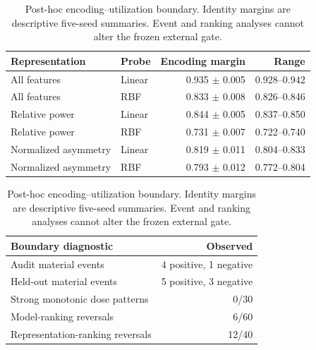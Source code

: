 
\begin{table}[t]
\centering
\caption{Post-hoc encoding--utilization boundary. Identity margins are descriptive five-seed summaries. Event and ranking analyses cannot alter the frozen external gate.}
\label{tab:eegemotions27-boundary}
\begin{tabular}{llrr}
\toprule
Representation & Probe & Encoding margin & Range \\
\midrule
All features & Linear & 0.935 $\pm$ 0.005 & 0.928--0.942 \\
All features & RBF & 0.833 $\pm$ 0.008 & 0.826--0.846 \\
Relative power & Linear & 0.844 $\pm$ 0.005 & 0.837--0.850 \\
Relative power & RBF & 0.731 $\pm$ 0.007 & 0.722--0.740 \\
Normalized asymmetry & Linear & 0.819 $\pm$ 0.011 & 0.804--0.833 \\
Normalized asymmetry & RBF & 0.793 $\pm$ 0.012 & 0.772--0.804 \\
\bottomrule
\end{tabular}
\par\vspace{1.0ex}
\begin{tabular}{lr}
\toprule
Boundary diagnostic & Observed \\
\midrule
Audit material events & 4 positive, 1 negative \\ 
Held-out material events & 5 positive, 3 negative \\ 
Strong monotonic dose patterns & 0/30 \\ 
Model-ranking reversals & 6/60 \\ 
Representation-ranking reversals & 12/40 \\ 
\bottomrule
\end{tabular}
\end{table}
